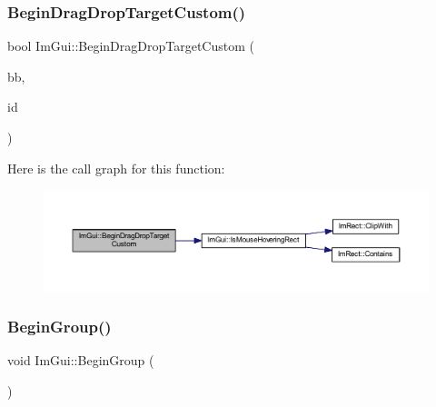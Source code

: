 \subsubsection{\texorpdfstring{Begin\+Drag\+Drop\+Target\+Custom()}{BeginDragDropTargetCustom()}}
{\footnotesize\ttfamily bool Im\+Gui\+::\+Begin\+Drag\+Drop\+Target\+Custom (\begin{DoxyParamCaption}\item[{const \mbox{\hyperlink{struct_im_rect}{Im\+Rect}} \&}]{bb,  }\item[{\mbox{\hyperlink{imgui_8h_a1785c9b6f4e16406764a85f32582236f}{Im\+Gui\+ID}}}]{id }\end{DoxyParamCaption})}

Here is the call graph for this function\+:
\nopagebreak
\begin{figure}[H]
\begin{center}
\leavevmode
\includegraphics[width=350pt]{namespace_im_gui_a929a420d3af29051a140d0f36addbcd2_cgraph}
\end{center}
\end{figure}
\mbox{\label{namespace_im_gui_a42407e196b7ed2a8755bff28aae9805f}} 
\subsubsection{\texorpdfstring{Begin\+Group()}{BeginGroup()}}
{\footnotesize\ttfamily void Im\+Gui\+::\+Begin\+Group (\begin{DoxyParamCaption}{ }\end{DoxyParamCaption})}

